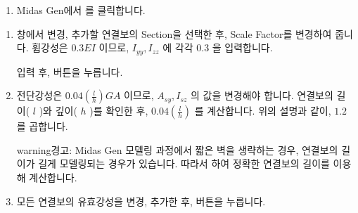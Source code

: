 \documentclass[a4paper,10pt,korean]{sphinxmanual}
\begin{document}
\begin{sphinxShadowBox}
\begin{enumerate}
%
\item {} 
\sphinxAtStartPar
Midas Gen에서  \sphinxhyphen{}  \sphinxhyphen{}  를 클릭합니다.

\end{enumerate}
\begin{enumerate}
%
\setcounter{enumi}{1}
\item {} 
\sphinxAtStartPar
{} 창에서 변경, 추가할 연결보의 Section을 선택한 후, Scale Factor를 변경하여 줍니다.
휨강성은 \(0.3EI\) 이므로, \(I_{yy}, I_{zz}\) 에 각각 \(0.3\) 을 입력합니다.


\sphinxAtStartPar
입력 후,  버튼을 누릅니다.

\item {} 
\sphinxAtStartPar
전단강성은 \(0.04(\frac{l}{h})GA\) 이므로, \(A_{sy}, I_{sz}\) 의 값을 변경해야 합니다.
연결보의 길이( \(l\) )와 깊이( \(h\) )를 확인한 후, \(0.04(\frac{l}{h})\) 를 계산합니다.
위의 설명과 같이, \(1.2\) 를 곱합니다.

\begin{center}
\noindent{}
\end{center}

\begin{sphinxadmonition}{warning}{경고:}
\sphinxAtStartPar
Midas Gen 모델링 과정에서 짧은 벽을 생략하는 경우, 연결보의 길이가 길게 모델링되는 경우가 있습니다.
따라서  하여 정확한 연결보의 길이를 이용해 계산합니다.
\end{sphinxadmonition}

\item {} 
\sphinxAtStartPar
모든 연결보의 유효강성을 변경, 추가한 후,  버튼을 누릅니다.

\end{enumerate}
\end{sphinxShadowBox}
\end{document}
